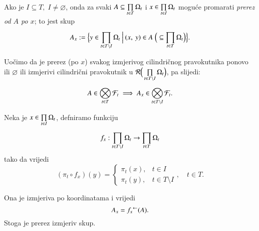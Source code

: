 \begin{defn}    \label{defn:4.6-1}
    Ako je $I \subseteq T, \; I \neq \varnothing$, onda za svaki $A \subseteq \prod\limits_{t \in T}^{} \Omega_t$ i $x \in \prod\limits_{t \in I}^{} \Omega_t$ mogu\' ce promarati \emph{prerez od $A$ po $x$}; to jest skup
    \begin{equation*}
        A_x := \Big\{ {y \in \prod\limits_{t \in T \setminus I}^{} \Omega_t} \: \Big| \: {(x, \: y) \in A \; \Big(\subseteq \prod\limits_{t \in T}^{} \Omega_t \Big)} \Big\}.
    \end{equation*}
\end{defn}
Uo\v cimo da je prerez (po $x$) svakog izmjerivog cilindri\v cnog pravokutnika ponovo ili $\varnothing$ ili izmjerivi cilindri\v cni pravokutnik u $\mathcal{R} \Big( \prod\limits_{t \in T \setminus I}^{} \Omega_t \Big)$, pa slijedi:
\begin{equation}    \label{jed:4.7}
    A \in \bigotimes\limits_{t \in T}^{} \mathcal{F}_t \implies A_x \in \bigotimes\limits_{t \in T \setminus I}^{} \mathcal{F}_t.
\end{equation}

\begin{nap} \label{nap:4.7-1}
    Neka je $x \in \prod\limits_{t \in I}^{} \Omega_t$, defniramo funkciju
    \begin{equation*}
        f_x : \prod\limits_{t \in T \setminus I}^{} \Omega_t \to \prod\limits_{t \in T}^{} \Omega_t
    \end{equation*}
    tako da vrijedi
    \begin{equation*}
        (\pi_t \circ f_x) (y)
        = \begin{cases}
            \pi_t(x), &t \in I\\
            \pi_t(y), &t \in T \setminus I
        \end{cases}, \quad t \in T.
    \end{equation*}
    \begin{figure}[H]
        \centering
    \end{figure}
    Ona je izmjeriva po koordinatama i vrijedi
    \begin{equation*}
        A_x = {f_x}^{\leftarrow} (A).
    \end{equation*}
    Stoga je prerez izmjeriv skup.
\end{nap}

